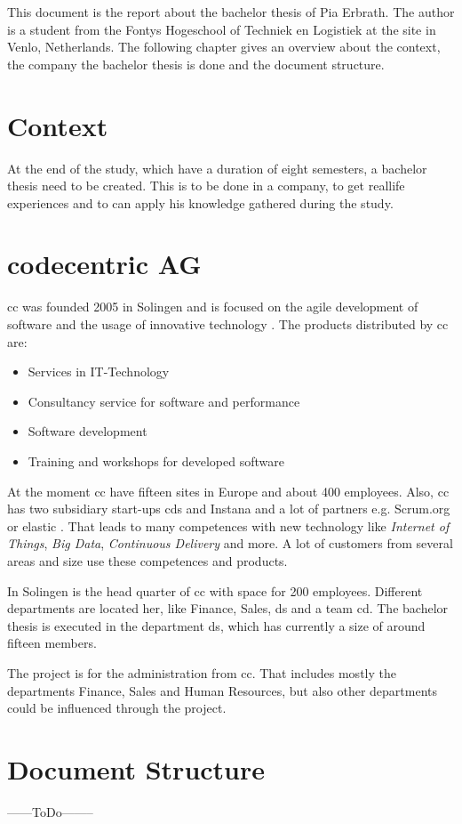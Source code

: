 This document is the report about the bachelor thesis of Pia Erbrath. The author is a student from the Fontys Hogeschool of Techniek en Logistiek at the site in Venlo, Netherlands. The following chapter gives an overview about the context, the company the bachelor thesis is done and the document structure.

\section{Context}
At the end of the study, which have a duration of eight semesters, a bachelor thesis need to be created. This is to be done in a company, to get \flqq real\frqq life experiences and to can apply his knowledge gathered during the study.  

\section{codecentric AG}
\Gls{cc} was founded 2005 in Solingen and is focused on the agile development of software and the usage of innovative technology \parencite{codecentric2018unternehmen}. The products distributed by \gls{cc} are: 
\begin{itemize}
	\item Services in \gls{IT}-Technology
	\item Consultancy service for software and performance
	\item Software development
	\item Training and workshops for developed software
\end{itemize}
At the moment \gls{cc} have fifteen sites in Europe and about 400 employees. Also, \gls{cc} has two subsidiary start-ups \glspl{cd} and Instana \parencite{codecentric2018startups} and a lot of partners e.g. Scrum.org or elastic \parencite{codecentric2018partner}.
That leads to many competences with new technology like \textit{Internet of Things}, \textit{Big Data}, \textit{Continuous Delivery} and more.
A lot of customers from several areas and size use these competences and products.

In Solingen is the head quarter of \gls{cc} with space for 200 employees. Different departments are located her, like Finance, Sales, \gls{ds} and a team \gls{cd}.   
The bachelor thesis is executed in the department \gls{ds}, which has currently a size of around fifteen members.

The project is for the administration from \gls{cc}. That includes mostly the departments Finance, Sales and Human Resources, but also other departments could be influenced through the project.

\section{Document Structure}
------ToDo--------